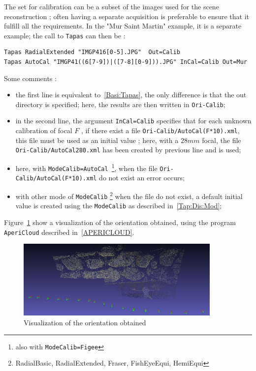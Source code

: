 The set for calibration can be a subset of the images used for the scene
reconstruction ; often having a separate acquisition  is preferable to
ensure that it fulfill all the requirements.
In the "Mur Saint Martin"  example, it is
a separate example;  the call to {\tt Tapas} can then be :


\begin{verbatim}
Tapas RadialExtended "IMGP416[0-5].JPG"  Out=Calib
Tapas AutoCal "IMGP41((6[7-9])|([7-8][0-9])).JPG" InCal=Calib Out=Mur
\end{verbatim}

Some comments :

\begin{itemize}
   \item the first line is equivalent to~\ref{Basi:Tapas}, the only difference
	 is that the out directory is specified; here, the results are  then written
	 in {\tt Ori-Calib};


   \item in the second line, the argument {\tt InCal=Calib} specifies that for each
	 unknown calibration of focal $F$ , if there exist a file {\tt Ori-Calib/AutoCal(F*10).xml},
	 this file must be used as an initial value ; here, with a $28mm$ focal,
	 the file {\tt Ori-Calib/AutoCal280.xml} has been created by previous line
	 and is used;

    \item  here, with {\tt  ModeCalib=AutoCal}~\footnote{also with {\tt ModeCalib=Figee}},
	    when the file  {\tt Ori-Calib/AutoCal(F*10).xml} do not exist an error occurs;


    \item  with other mode of {\tt ModeCalib}
	   \footnote{RadialBasic, RadialExtended, Fraser, FishEyeEqui, HemiEqui}
	    when the file do not exist, a default initial value is created using
	    the {\tt ModeCalib}  as described in~\ref{Tap:Dis:Mod};
\end{itemize}


Figure~\ref{FIG:StM:OriMur} show a visualization of the orientation obtained, using
the program {\tt AperiCloud} described in~\ref{APERICLOUD}.

\begin{figure}
\begin{center}
\includegraphics[width=100mm]{FIGS/MurSaintMartin/AperiCloudSnap00.jpg}
\end{center}
\caption{Visualization of the orientation obtained }
\label{FIG:StM:OriMur}
\end{figure}

